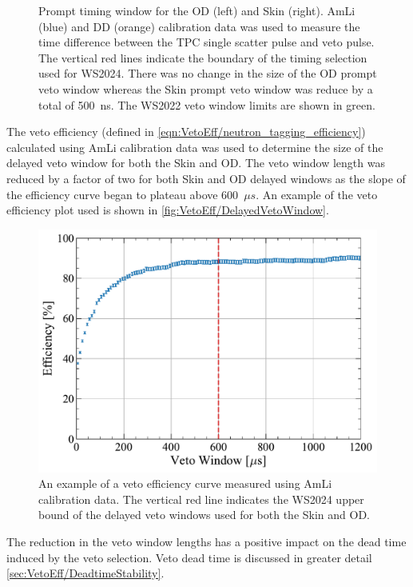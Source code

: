 \begin{figure}[!ht]
\begin{subfigure}[b]{0.49\textwidth}
		\caption{}
        \label{fig:VetoEff/skin_prompt_window}
	\end{subfigure}
	\caption{Prompt timing window for the OD (left) and Skin (right). %
    AmLi (blue) and DD (orange) calibration data was used to measure the time difference between the TPC single scatter pulse and veto pulse. 
    The vertical red lines indicate the boundary of the timing selection used for WS2024. There was no change in the size of the OD prompt veto window whereas the Skin prompt veto window was reduce by a total of 500~ns. The WS2022 veto window limits are shown in green.}
	\label{fig:VetoEff/veto_prompt_windows}
\end{figure}

The veto efficiency (defined in \ref{eqn:VetoEff/neutron_tagging_efficiency}) calculated using AmLi calibration data was used to determine the size of the delayed veto window for both the Skin and OD. The veto window length was reduced by a factor of two for both Skin and OD delayed windows as the slope of the efficiency curve began to plateau above 600~$\mu s$. An example of the veto efficiency plot used is shown in \autoref{fig:VetoEff/DelayedVetoWindow}.
\begin{figure}[!ht]
    \centering
    \includegraphics[width=0.5\linewidth]{figures/VetoEfficiency/DelayedVetoWindow.pdf}
    \caption{An example of a veto efficiency curve measured using AmLi calibration data. The vertical red line indicates the WS2024 upper bound of the delayed veto windows used for both the Skin and OD.}
    \label{fig:VetoEff/DelayedVetoWindow}
\end{figure}

The reduction in the veto window lengths has a positive impact on the dead time induced by the veto selection. Veto dead time is discussed in greater detail \autoref{sec:VetoEff/DeadtimeStability}.

